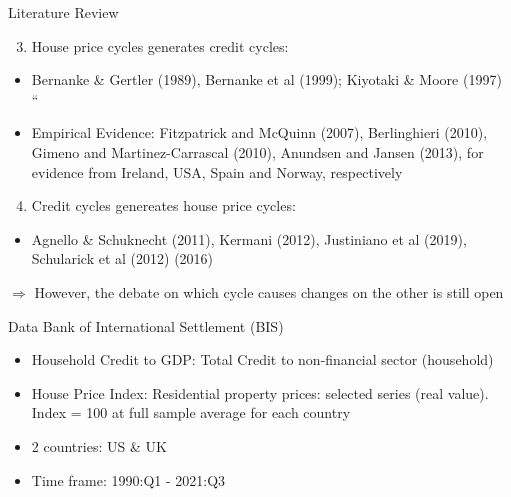 \documentclass[
  ignorenonframetext,
]{beamer}
\providecommand{\tightlist}{%
  \setlength{\itemsep}{0pt}\setlength{\parskip}{0pt}}
\begin{document}
\begin{frame}{Literature Review}
\protect\hypertarget{literature-review-1}{}
\begin{enumerate}
\setcounter{enumi}{2}
\tightlist
\item
  House price cycles generates credit cycles:
\end{enumerate}

\begin{itemize}
\tightlist
\item
  Bernanke \& Gertler (1989), Bernanke et al (1999); Kiyotaki \& Moore
  (1997) ``
\item
  Empirical Evidence: Fitzpatrick and McQuinn (2007), Berlinghieri
  (2010), Gimeno and Martinez-Carrascal (2010), Anundsen and Jansen
  (2013), for evidence from Ireland, USA, Spain and Norway, respectively
\end{itemize}

\begin{enumerate}
\setcounter{enumi}{3}
\tightlist
\item
  Credit cycles genereates house price cycles:
\end{enumerate}

\begin{itemize}
\tightlist
\item
  Agnello \& Schuknecht (2011), Kermani (2012), Justiniano et al (2019),
  Schularick et al (2012) (2016)
\end{itemize}

\(\Rightarrow\) However, the debate on which cycle causes changes on the
other is still open
\end{frame}

\begin{frame}{Data}
\protect\hypertarget{data}{}
Bank of International Settlement (BIS)

\begin{itemize}
\tightlist
\item
  Household Credit to GDP: Total Credit to non-financial sector
  (household)
\item
  House Price Index: Residential property prices: selected series (real
  value). Index = 100 at full sample average for each country \bigskip
\item
  2 countries: US \& UK
\item
  Time frame: 1990:Q1 - 2021:Q3
\end{itemize}
\end{frame}
\end{document}
